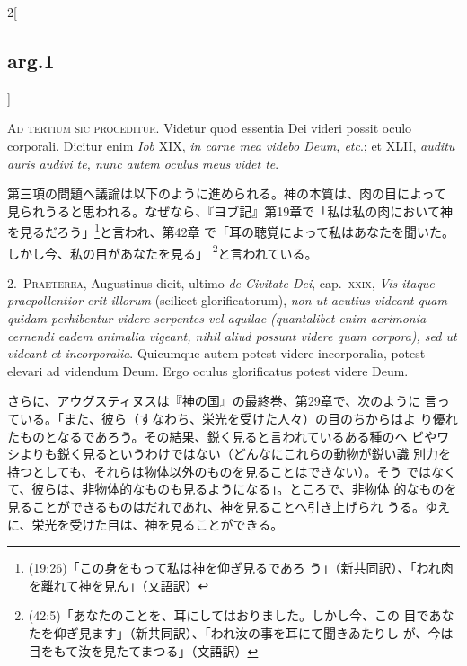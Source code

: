 \documentclass[paper=a4paper,fontsize=10pt,jafontsize=9pt,titlepage]{jlreq}
\begin{document}
\begin{paracol}{2}[\subsection{arg.1}]

{\scshape \large Ad tertium sic proceditur}. Videtur quod essentia Dei videri
possit oculo corporali. Dicitur enim {\itshape Iob} XIX, {\itshape in carne mea videbo Deum,
etc}.; et XLII, {\itshape auditu auris audivi te, nunc autem oculus meus videt te}.

\switchcolumn

第三項の問題へ議論は以下のように進められる。神の本質は、肉の目によって
見られうると思われる。なぜなら、『ヨブ記』第19章で「私は私の肉において神
を見るだろう」\footnote{(19:26)「この身をもって私は神を仰ぎ見るであろ
う」（新共同訳）、「われ肉を離れて神を見ん」（文語訳）}と言われ、第42章
で「耳の聴覚によって私はあなたを聞いた。しかし今、私の目があなたを見る」
\footnote{(42:5)「あなたのことを、耳にしてはおりました。しかし今、この
目であなたを仰ぎ見ます」（新共同訳）、「われ汝の事を耳にて聞きゐたりし
が、今は目をもて汝を見たてまつる」（文語訳）}と言われている。


2.~{\scshape Praeterea}, Augustinus dicit, ultimo {\itshape de Civitate Dei},
cap.\ {\scshape xxix}, {\itshape Vis itaque praepollentior erit illorum}
(scilicet glorificatorum), {\itshape non ut acutius videant quam quidam
perhibentur videre serpentes vel aquilae (quantalibet enim acrimonia
cernendi eadem animalia vigeant, nihil aliud possunt videre quam
corpora), sed ut videant et incorporalia}.  Quicumque autem potest
videre incorporalia, potest elevari ad videndum Deum. Ergo oculus
glorificatus potest videre Deum.

\switchcolumn

さらに、アウグスティヌスは『神の国』の最終巻、第29章で、次のように
言っている。「また、彼ら（すなわち、栄光を受けた人々）の目のちからはよ
り優れたものとなるであろう。その結果、鋭く見ると言われているある種のヘ
ビやワシよりも鋭く見るというわけではない（どんなにこれらの動物が鋭い識
別力を持つとしても、それらは物体以外のものを見ることはできない）。そう
ではなくて、彼らは、非物体的なものも見るようになる」。ところで、非物体
的なものを見ることができるものはだれであれ、神を見ることへ引き上げられ
うる。ゆえに、栄光を受けた目は、神を見ることができる。


\end{paracol}
\end{document}
